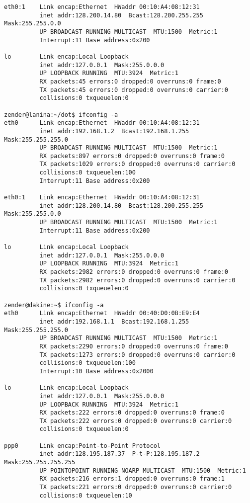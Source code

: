 \documentclass[12pt,twoside]{article}
\begin{document}
\begin{verbatim}
eth0:1    Link encap:Ethernet  HWaddr 00:10:A4:08:12:31  
          inet addr:128.200.14.80  Bcast:128.200.255.255  Mask:255.255.0.0
          UP BROADCAST RUNNING MULTICAST  MTU:1500  Metric:1
          Interrupt:11 Base address:0x200 

lo        Link encap:Local Loopback  
          inet addr:127.0.0.1  Mask:255.0.0.0
          UP LOOPBACK RUNNING  MTU:3924  Metric:1
          RX packets:45 errors:0 dropped:0 overruns:0 frame:0
          TX packets:45 errors:0 dropped:0 overruns:0 carrier:0
          collisions:0 txqueuelen:0 

zender@lanina:~/dot$ ifconfig -a
eth0      Link encap:Ethernet  HWaddr 00:10:A4:08:12:31
          inet addr:192.168.1.2  Bcast:192.168.1.255  Mask:255.255.255.0
          UP BROADCAST RUNNING MULTICAST  MTU:1500  Metric:1
          RX packets:897 errors:0 dropped:0 overruns:0 frame:0
          TX packets:1029 errors:0 dropped:0 overruns:0 carrier:0
          collisions:0 txqueuelen:100
          Interrupt:11 Base address:0x200
 
eth0:1    Link encap:Ethernet  HWaddr 00:10:A4:08:12:31
          inet addr:128.200.14.80  Bcast:128.200.255.255  Mask:255.255.0.0
          UP BROADCAST RUNNING MULTICAST  MTU:1500  Metric:1
          Interrupt:11 Base address:0x200
 
lo        Link encap:Local Loopback
          inet addr:127.0.0.1  Mask:255.0.0.0
          UP LOOPBACK RUNNING  MTU:3924  Metric:1
          RX packets:2982 errors:0 dropped:0 overruns:0 frame:0
          TX packets:2982 errors:0 dropped:0 overruns:0 carrier:0
          collisions:0 txqueuelen:0

zender@dakine:~$ ifconfig -a
eth0      Link encap:Ethernet  HWaddr 00:40:D0:0B:E9:E4
          inet addr:192.168.1.1  Bcast:192.168.1.255  Mask:255.255.255.0
          UP BROADCAST RUNNING MULTICAST  MTU:1500  Metric:1
          RX packets:2290 errors:0 dropped:0 overruns:0 frame:0
          TX packets:1273 errors:0 dropped:0 overruns:0 carrier:0
          collisions:0 txqueuelen:100
          Interrupt:10 Base address:0x2000
 
lo        Link encap:Local Loopback
          inet addr:127.0.0.1  Mask:255.0.0.0
          UP LOOPBACK RUNNING  MTU:3924  Metric:1
          RX packets:222 errors:0 dropped:0 overruns:0 frame:0
          TX packets:222 errors:0 dropped:0 overruns:0 carrier:0
          collisions:0 txqueuelen:0
 
ppp0      Link encap:Point-to-Point Protocol
          inet addr:128.195.187.37  P-t-P:128.195.187.2  Mask:255.255.255.255
          UP POINTOPOINT RUNNING NOARP MULTICAST  MTU:1500  Metric:1
          RX packets:216 errors:1 dropped:0 overruns:0 frame:1
          TX packets:221 errors:0 dropped:0 overruns:0 carrier:0
          collisions:0 txqueuelen:10


\end{verbatim}
\end{document}
